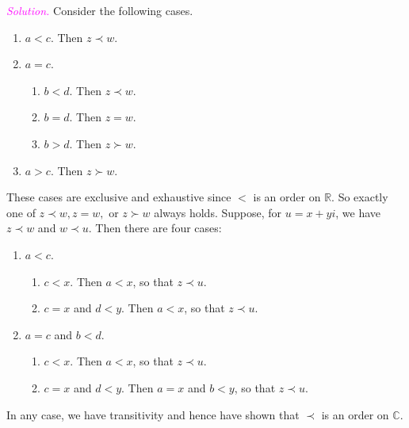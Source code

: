 \documentclass[12pt]{article}
\newcommand{\newp}{\vspace{5mm}}
\theoremstyle{definition}
\begin{document}
\newp

\textit{\textcolor{magenta}{Solution.}} Consider the following cases.

\begin{enumerate}[label = Case \arabic*., font=\bfseries, wide=0pt]
    \item \( a < c \). Then \( z \prec w \).
    \item \( a = c \).
    \begin{enumerate}[label* = \arabic*., font=\bfseries, wide=10pt]
        \item \( b < d \). Then \( z \prec w \).
        \item \( b = d \). Then \( z = w \).
        \item \( b > d \). Then \( z \succ w \).
    \end{enumerate}
    \item \( a > c \). Then \( z \succ w \).
\end{enumerate}

These cases are exclusive and exhaustive since \( < \) is an order on \( \mathbb{R} \). So exactly one of \( z \prec w, z = w, \) or \( z \succ w \) always holds. Suppose, for \( u = x + yi \), we have \( z \prec w \) and \( w \prec u \). Then there are four cases:

\begin{enumerate}[label = Case \arabic*., font=\bfseries, wide=0pt]
    \item \( a < c \).
    \begin{enumerate}[label* = \arabic*., font=\bfseries, wide=10pt]
        \item \( c < x \). Then \( a < x \), so that \( z \prec u \).
        \item \( c = x \) and \( d < y \). Then \( a < x \), so that \( z \prec u \).
    \end{enumerate}
    \item \( a = c \) and \( b < d \).
    \begin{enumerate}[label* = \arabic*., font=\bfseries, wide=10pt]
        \item \( c < x \). Then \( a < x \), so that \( z \prec u \).
        \item \( c = x \) and \( d < y \). Then \( a = x \) and \( b < y \), so that \( z \prec u \).
    \end{enumerate}
\end{enumerate}

In any case, we have transitivity and hence have shown that \( \prec \) is an order on \( \mathbb{C} \).
\end{document}
